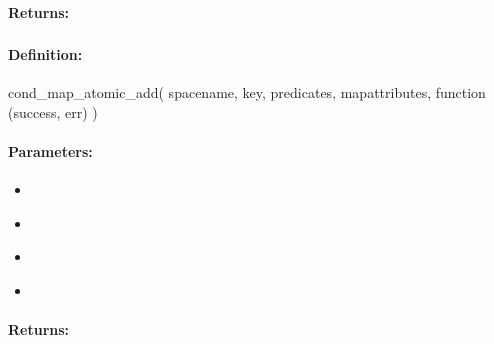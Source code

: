 \paragraph{Returns:}


\pagebreak
\subsubsection{}
\label{api:nodejs:cond_map_atomic_add}


\paragraph{Definition:}
\begin{javascriptcode}
cond_map_atomic_add(
        spacename, key, predicates, mapattributes, function (success, err) {})
\end{javascriptcode}
\paragraph{Parameters:}
\begin{itemize}[noitemsep]
\item {}\\

\item {}\\

\item {}\\

\item {}\\

\end{itemize}

\paragraph{Returns:}


\pagebreak
\subsubsection{}
\label{api:nodejs:map_atomic_sub}


